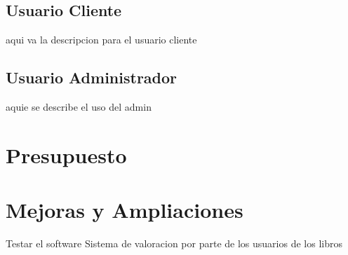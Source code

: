 \documentclass[a4paper]{report}
\begin{document}
        \subsection{Usuario Cliente}
    aqui va la descripcion para el usuario cliente
        \subsection{Usuario Administrador}
    aquie se describe el uso del admin

	\section{Presupuesto}

    \section{Mejoras y Ampliaciones}
    Testar el software
    Sistema de valoracion por parte de los usuarios de los libros
\end{document}

